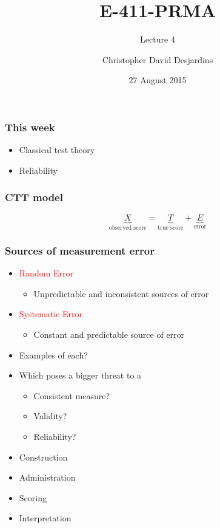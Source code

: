 \documentclass[dvipsnames]{beamer}\usepackage[]{graphicx}\usepackage[]{color}
\title{E-411-PRMA}
\subtitle{Lecture 4}
\author{Christopher David Desjardins}
\date{27 August 2015}
\begin{document}
\frame{\titlepage}

\begin{frame}
\frametitle{This week}
\begin{itemize}
  \item Classical test theory
  \item Reliability
\end{itemize}
\end{frame}

\begin{frame}
\frametitle{CTT model}

\begin{center}
$$ \underbrace{X}_{\text{observed score}} = \underbrace{T}_{\text{true score}} + \underbrace{E}_{\text{error}} $$
\end{center}
\end{frame}

\begin{frame}
\frametitle{Sources of measurement error}
\begin{itemize}
\item<1->\textcolor{red}{Random Error}
  \begin{itemize}
  \item<2-> Unpredictable and inconsistent sources of error
  \end{itemize}
\item<3->\textcolor{red}{Systematic Error}
  \begin{itemize}
  \item<4->Constant and predictable source of error
  \end{itemize}
\item<5->Examples of each?
\item<6->Which poses a bigger threat to a
  \begin{itemize} 
    \item<7-> Consistent measure?
    \item<8-> Validity?
    \item<9-> Reliability?
  \end{itemize}
\end{itemize}
\end{frame}

\begin{frame}
\begin{itemize}
  \item Construction
  \item Administration
  \item Scoring
  \item Interpretation
\end{itemize}
\end{frame}
\end{document}
